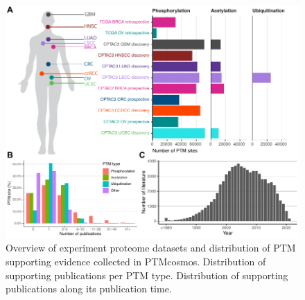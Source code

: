 \begin{figure}[tbp]
    \centering
    \includegraphics[width=\linewidth]{figures/chap03_ptmcosmos/figure1_ptmcosmos_stats.pdf}
    \caption[Overview of experiment proteome datasets and distribution of PTM supporting evidence collected in PTMcosmos.]{%
        Overview of experiment proteome datasets  and distribution of PTM supporting evidence collected in PTMcosmos.
        Distribution of supporting publications per PTM type.
        Distribution of supporting publications along its publication time.
    }
    \label{fig:ptmcosmos-stats}
\end{figure}



